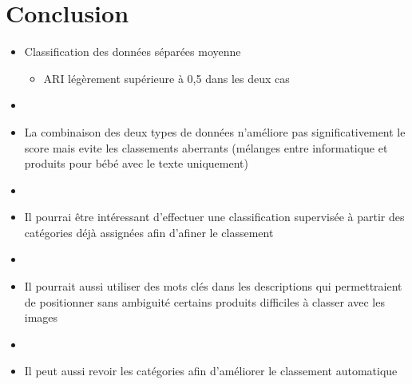 \documentclass[8pt,aspectratio=169,hyperref={unicode=true}]{beamer}
\begin{document}
\section{Conclusion}
\begin{frame}
    \begin{itemize}
        \item Classification des données séparées moyenne
              \begin{itemize}
                  \item ARI légèrement supérieure à 0,5 dans les deux cas
              \end{itemize}
        \item[]
        \item La combinaison des deux types de données n'améliore pas significativement le score mais evite les classements aberrants (mélanges entre informatique et produits pour bébé avec le texte uniquement)
        \item[]
        \item Il pourrai être intéressant d'effectuer une classification supervisée à partir des catégories déjà assignées afin d'afiner le classement
        \item[]
        \item Il pourrait aussi utiliser des mots clés dans les descriptions qui permettraient de positionner sans ambiguité certains produits difficiles à classer avec les images
        \item[]
        \item Il peut aussi revoir les catégories afin d'améliorer le classement automatique
    \end{itemize}
\end{frame}
\end{document}
